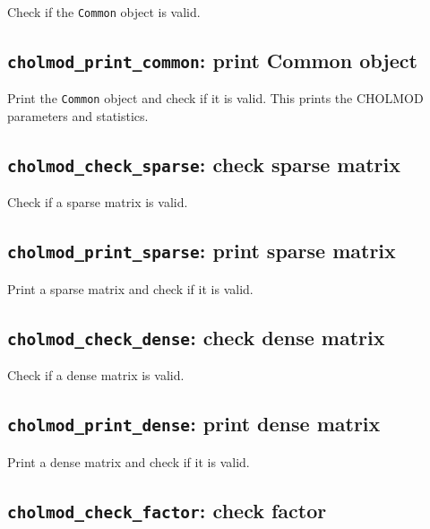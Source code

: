 \documentclass[11pt]{article}
\begin{document}

Check if the {\tt Common} object is valid.

\subsection{{\tt cholmod\_print\_common}: print Common object}


Print the {\tt Common} object and check if it is valid.
This prints the CHOLMOD parameters and statistics.

\newpage \subsection{{\tt cholmod\_check\_sparse}: check sparse matrix}


Check if a sparse matrix is valid.

\subsection{{\tt cholmod\_print\_sparse}: print sparse matrix}


Print a sparse matrix and check if it is valid.

\newpage \subsection{{\tt cholmod\_check\_dense}: check dense matrix}


Check if a dense matrix is valid.

\subsection{{\tt cholmod\_print\_dense}: print dense matrix}


Print a dense matrix and check if it is valid.

\newpage \subsection{{\tt cholmod\_check\_factor}: check factor}
\end{document}
